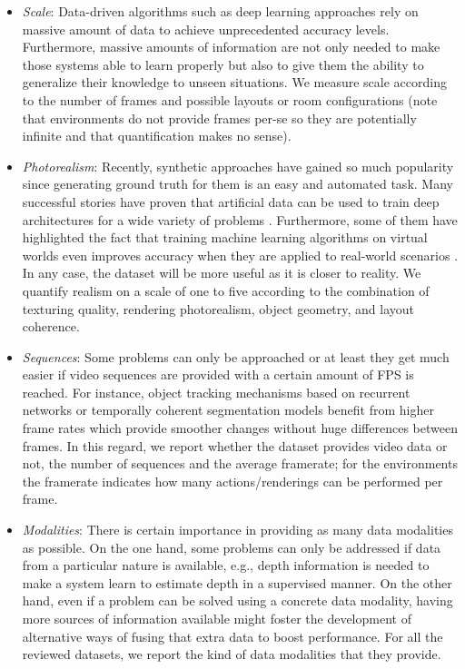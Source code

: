 \begin{itemize}
  \item \emph{Scale}: Data-driven algorithms such as deep learning approaches rely on massive amount of data to achieve unprecedented accuracy levels. Furthermore, massive amounts of information are not only needed to make those systems able to learn properly but also to give them the ability to generalize their knowledge to unseen situations. We measure scale according to the number of frames and possible layouts or room configurations (note that environments do not provide frames per-se so they are potentially infinite and that quantification makes no sense).
  \item \emph{Photorealism}: Recently, synthetic approaches have gained so much popularity since generating ground truth for them is an easy and automated task. Many successful stories have proven that artificial data can be used to train deep architectures for a wide variety of problems \cite{Ros2016,Lin2016,Mahendran2016,Jiang2017,Mueller2017,Zhang16}. Furthermore, some of them have highlighted the fact that training machine learning algorithms on virtual worlds even improves accuracy when they are applied to real-world scenarios \cite{Johnson-Roberson2016} \cite{Tobin2017}. In any case, the dataset will be more useful as it is closer to reality. We quantify realism on a scale of one to five according to the combination of texturing quality, rendering photorealism, object geometry, and layout coherence.
  \item \emph{Sequences}: Some problems can only be approached or at least they get much easier if video sequences are provided with a certain amount of \ac{FPS} is reached. For instance, object tracking mechanisms based on recurrent networks \cite{Held2016} or temporally coherent segmentation models \cite{Shelhamer2016} benefit from higher frame rates which provide smoother changes without huge differences between frames. In this regard, we report whether the dataset provides video data or not, the number of sequences and the average framerate; for the environments the framerate indicates how many actions/renderings can be performed per frame.
  \item \emph{Modalities}: There is certain importance in providing as many data modalities as possible. On the one hand, some problems can only be addressed if data from a particular nature is available, e.g., depth information is needed to make a system learn to estimate depth in a supervised manner. On the other hand, even if a problem can be solved using a concrete data modality, having more sources of information available might foster the development of alternative ways of fusing that extra data to boost performance. For all the reviewed datasets, we report the kind of data modalities that they provide.

\end{itemize}

